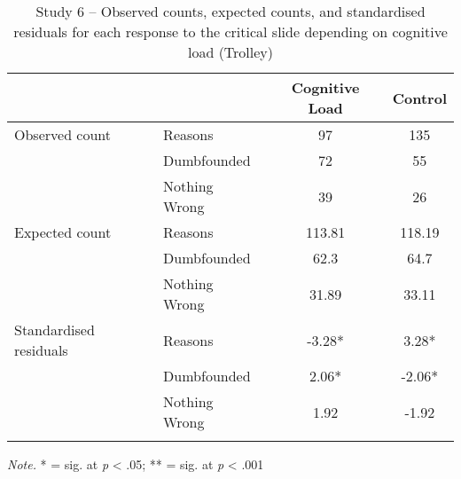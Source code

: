 \documentclass[
  american,
  man,floatsintext]{apa7}
\begin{document}
\begin{table}[tbp]

\begin{center}
\begin{threeparttable}

\caption{\label{tab:tabS6tab1dumbTrolley}Study 6 – Observed counts, expected counts, and standardised residuals for each response to the critical slide depending on cognitive load (Trolley)}

\begin{tabular}{llcc}
\toprule
 & \multicolumn{1}{c}{} & \multicolumn{1}{c}{Cognitive Load} & \multicolumn{1}{c}{Control}\\
\midrule
Observed count & Reasons & 97 & 135\\
 & Dumbfounded & 72 & 55\\
 & Nothing Wrong & 39 & 26\\
Expected count & Reasons & 113.81 & 118.19\\
 & Dumbfounded & 62.3 & 64.7\\
 & Nothing Wrong & 31.89 & 33.11\\
Standardised residuals & Reasons & -3.28* & 3.28*\\
 & Dumbfounded & 2.06* & -2.06*\\
 & Nothing Wrong & 1.92 & -1.92\\
\bottomrule
\addlinespace
\end{tabular}

\begin{tablenotes}[para]
\normalsize{\textit{Note.} * = sig. at \emph{p} < .05; ** = sig. at \emph{p} < .001}
\end{tablenotes}

\end{threeparttable}
\end{center}

\end{table}
\end{document}
